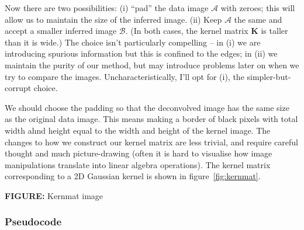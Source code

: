 \documentclass[letterpaper, 11pt]{article}
\def\FIG#1{{\bf FIGURE: }{#1}}
\begin{document}
Now there are two possibilities: (i) ``pad'' the data image $\mathcal A$ with zeroes; this will allow us to maintain the size of the inferred image. (ii) Keep $\mathcal A$ the same and accept a smaller inferred image $\mathcal B$. (In both cases, the kernel matrix $\mathbf K$ is taller than it is wide.) The choice isn't particularly compelling -- in (i) we are introducing spurious information but this is confined to the edges; in (ii) we maintain the purity of our method, but may introduce problems later on when we try to compare the images. Uncharacteristically, I'll opt for (i), the simpler-but-corrupt choice.

We should choose the padding so that the deconvolved image has the same size as the original data image. This means making a border of black pixels with total width ahnd height equal to the width and height of the kernel image. The changes to how we construct our kernel matrix are less trivial, and require careful thought and much picture-drawing (often it is hard to visualise how image manipulations translate into linear algebra operations). The kernel matrix corresponding to a 2D Gaussian kernel is shown in figure~\ref{fig:kernmat}.

\FIG{Kernmat image}
\label{fig:kernmat}


\subsubsection{Pseudocode}
\label{sec:decon_pseudocode}
\end{document}
